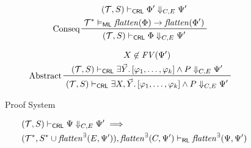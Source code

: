 \begin{figure}
\begin{align*}
    & \prftree[l]{Conseq}
      { \prfStackPremises
        { (\mathcal{T}, S) \vdash_\CRL \Phi^\prime \Downarrow_{C, E} \Psi^\prime}
        { \mathcal{T}^* \vDash_\ML \mathit{flatten}(\Phi) \rightarrow \mathit{flatten}(\Phi^\prime) }
      }
      { (\mathcal{T}, S) \vdash_\CRL \Phi \Downarrow_{C, E} \Psi^\prime}
    \end{align*}

    
    \begin{align*}
    & \prftree[l]{Abstract}
      { \prfStackPremises
        { X \not\in \mathit{FV}(\Psi^\prime)
        }
        {(\mathcal{T}, S) \vdash_\CRL \exists \vec{Y}.\, [\varphi_1, \ldots, \varphi_k] \land P \Downarrow_{C, E} \Psi^\prime}
      }
      {(\mathcal{T}, S) \vdash_\CRL \exists X, \vec{Y}.\, [\varphi_1, \ldots, \varphi_k] \land P \Downarrow_{C, E} \Psi^\prime}
    \end{align*}
    \caption{Proof System}
    \label{fig:CRLproofsystem}
\end{figure}



\begin{lemma}\label{lem:CRLalmostSoundness}
    \begin{align*}
        & (\mathcal{T}, S) \vdash_{\mathsf{CRL}} \Psi \Downarrow_{C,E} \Psi^\prime \implies \\
        &
        (\mathcal{T}^*, S^* \cup \mathit{flatten}^\exists(E, \Psi^\prime)), \mathit{flatten}^\exists(C, \Psi^\prime) \vdash_{\mathsf{RL}}
          \mathit{flatten}^\exists(\Psi, \Psi^\prime) 
    \end{align*}
\end{lemma}

